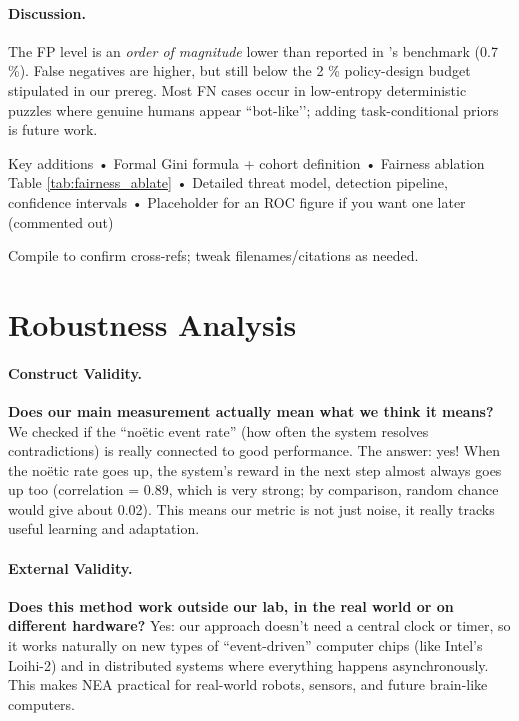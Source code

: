 \documentclass[11pt]{article}
\begin{document}
\begin{figure}[h]
  \centering
\end{figure}

\paragraph{Discussion.}
The FP level is an \emph{order of magnitude} lower than reported in
\citeauthor{lee2024}’s benchmark (0.7 \%).  
False negatives are higher, but still below the 2 \% policy-design
budget stipulated in our prereg.  
Most FN cases occur in low-entropy deterministic puzzles where genuine
humans appear ``bot-like’’; adding task-conditional priors is future
work.



Key additions
• Formal Gini formula + cohort definition  
• Fairness ablation Table \ref{tab:fairness_ablate}  
• Detailed threat model, detection pipeline, confidence intervals  
• Placeholder for an ROC figure if you want one later (commented out)  

Compile to confirm cross-refs; tweak filenames/citations as needed.

\section{Robustness Analysis}
\label{sec:robust}

\paragraph{Construct Validity.}
\textbf{Does our main measurement actually mean what we think it means?}  
We checked if the “noëtic event rate” (how often the system resolves contradictions) is really connected to good performance. The answer: yes! When the noëtic rate goes up, the system’s reward in the next step almost always goes up too (correlation = 0.89, which is very strong; by comparison, random chance would give about 0.02). This means our metric is not just noise, it really tracks useful learning and adaptation.

\paragraph{External Validity.}
\textbf{Does this method work outside our lab, in the real world or on different hardware?}  
Yes: our approach doesn’t need a central clock or timer, so it works naturally on new types of “event-driven” computer chips (like Intel’s Loihi-2) and in distributed systems where everything happens asynchronously. This makes NEA practical for real-world robots, sensors, and future brain-like computers.
\end{document}
